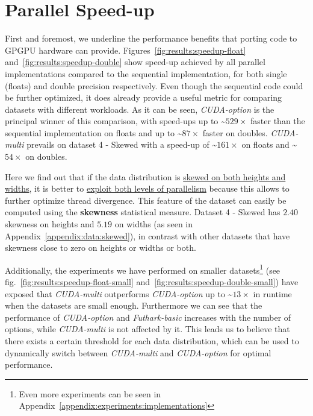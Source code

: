 \newpage
\section{Parallel Speed-up}
First and foremost, we underline the performance benefits that porting code to GPGPU hardware can provide. Figures~\ref{fig:results:speedup-float} and~\ref{fig:results:speedup-double} show speed-up achieved by all parallel implementations compared to the sequential implementation, for both single (floats) and double precision respectively. Even though the sequential code could be further optimized, it does already provide a useful metric for comparing datasets with different workloads. As it can be seen, \textit{CUDA-option} is the principal winner of this comparison, with speed-ups up to \textasciitilde$529\times$ faster than the sequential implementation on floats and up to \textasciitilde$87\times$ faster on doubles. \textit{CUDA-multi} prevails on dataset 4 - Skewed with a speed-up of \textasciitilde$161\times$ on floats and \textasciitilde$54\times$ on doubles. 


Here we find out that if the data distribution is \underline{skewed on both heights and widths}, it is better to \underline{exploit both levels of parallelism} because this allows to further optimize thread divergence. This feature of the dataset can easily be computed using the \textbf{skewness} statistical measure. Dataset 4 - Skewed has $2.40$ skewness on heights and $5.19$ on widths (as seen in Appendix~\ref{appendix:data:skewed}), in contrast with other datasets that have skewness close to zero on heights or widths or both.

Additionally, the experiments we have performed on smaller datasets\footnote{Even more experiments can be seen in Appendix~\ref{appendix:experiments:implementations}} (see fig.~\ref{fig:results:speedup-float-small} and~\ref{fig:results:speedup-double-small}) have exposed that \textit{CUDA-multi} outperforms \textit{CUDA-option} up to \textasciitilde$13\times$ in runtime when the datasets are small enough. Furthermore we can see that the performance of \textit{CUDA-option} and \textit{Futhark-basic} increases with the number of options, while \textit{CUDA-multi} is not affected by it. This leads us to believe that there exists a certain threshold for each data distribution, which can be used to dynamically switch between \textit{CUDA-multi} and \textit{CUDA-option} for optimal performance.    

